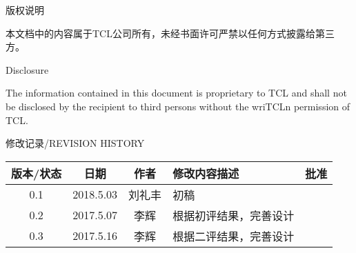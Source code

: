 
    \clearpage

    \begin{center}
        \par 版权说明
        \par 本文档中的内容属于TCL公司所有，未经书面许可严禁以任何方式披露给第三方。
        \vspace{2ex}
        \par Disclosure
        \par The information contained in this document is proprietary to TCL and shall not be disclosed by the recipient to third persons without the wriTCLn permission of TCL.
        \vspace{2ex}
        \par 修改记录/REVISION HISTORY
        \vspace{2ex}

    \begin{tabular}{|c|c|c|p{150pt}|c|}
        \hline
        版本/状态 & 日期 & 作者 & 修改内容描述 & 批准\\  %
        \hline
        0.1 & 2018.5.03 & 刘礼丰 & 初稿 & \\
        \hline
        0.2 & 2017.5.07 & 李辉 & 根据初评结果，完善设计 & \\
        \hline
        0.3 & 2017.5.16 & 李辉 & 根据二评结果，完善设计 & \\
        \hline
    \end{tabular}

    \end{center}